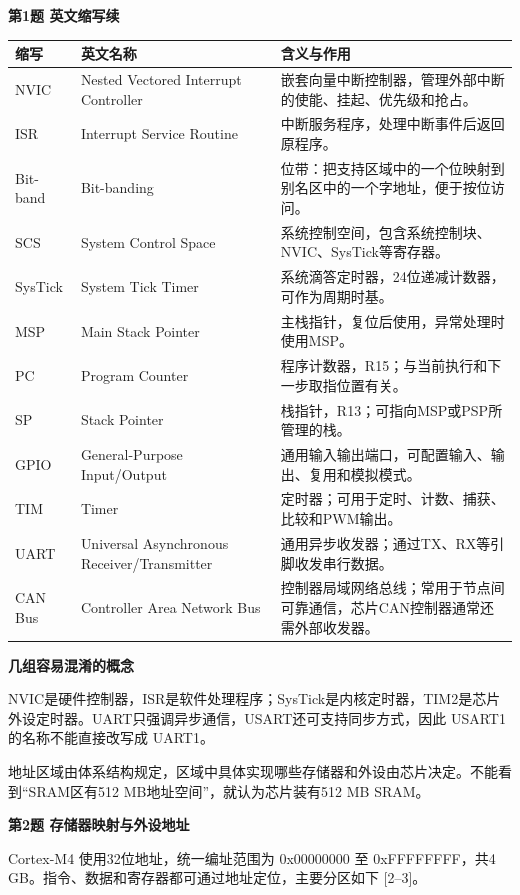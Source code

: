 \documentclass[10pt,a4paper]{article}
\newcommand{\qtitle}[1]{{\Large\bfseries #1}\par\vspace{4pt}}
\newcommand{\qsub}[1]{{\bfseries #1}\par}
\begin{document}
\clearpage
{}
\qtitle{第1题 英文缩写续}
\begingroup\small
\begin{tabularx}{\linewidth}{|>{\hsize}Y|>{\hsize}Y|>{\hsize}Y|}\hline
{}
\textbf{缩写} & \textbf{英文名称} & \textbf{含义与作用} \\ \hline
NVIC & Nested Vectored Interrupt Controller & 嵌套向量中断控制器，管理外部中断的使能、挂起、优先级和抢占。 \\ \hline
ISR & Interrupt Service Routine & 中断服务程序，处理中断事件后返回原程序。 \\ \hline
Bit-band & Bit-banding & 位带：把支持区域中的一个位映射到别名区中的一个字地址，便于按位访问。 \\ \hline
SCS & System Control Space & 系统控制空间，包含系统控制块、NVIC、SysTick等寄存器。 \\ \hline
SysTick & System Tick Timer & 系统滴答定时器，24位递减计数器，可作为周期时基。 \\ \hline
MSP & Main Stack Pointer & 主栈指针，复位后使用，异常处理时使用MSP。 \\ \hline
PC & Program Counter & 程序计数器，R15；与当前执行和下一步取指位置有关。 \\ \hline
SP & Stack Pointer & 栈指针，R13；可指向MSP或PSP所管理的栈。 \\ \hline
GPIO & General-Purpose Input/\allowbreak{}Output & 通用输入输出端口，可配置输入、输出、复用和模拟模式。 \\ \hline
TIM & Timer & 定时器；可用于定时、计数、捕获、比较和PWM输出。 \\ \hline
UART & Universal Asynchronous Receiver/\allowbreak{}Transmitter & 通用异步收发器；通过TX、RX等引脚收发串行数据。 \\ \hline
CAN Bus & Controller Area Network Bus & 控制器局域网络总线；常用于节点间可靠通信，芯片CAN控制器通常还需外部收发器。 \\ \hline
\end{tabularx}
\endgroup\par
\qsub{几组容易混淆的概念}
NVIC是硬件控制器，ISR是软件处理程序；SysTick是内核定时器，TIM2是芯片外设定时器。UART只强调异步通信，USART还可支持同步方式，因此 USART1 的名称不能直接改写成 UART1。

地址区域由体系结构规定，区域中具体实现哪些存储器和外设由芯片决定。不能看到“SRAM区有512 MB地址空间”，就认为芯片装有512 MB SRAM。


\clearpage
{}
\qtitle{第2题 存储器映射与外设地址}
Cortex-M4 使用32位地址，统一编址范围为 0x00000000 至 0xFFFFFFFF，共4 GB。指令、数据和寄存器都可通过地址定位，主要分区如下 [2–3]。
\end{document}
